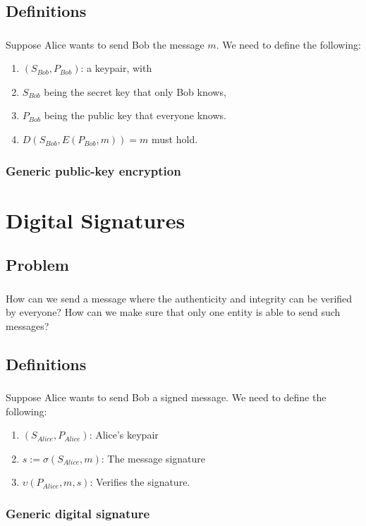 \documentclass{beamer}
\begin{document}
    \subsection{Definitions}
      \begin{frame}
        \frametitle{\insertsubsection}
        Suppose Alice wants to send Bob the message $m$. We need to define
        the following:
        \begin{enumerate}
          \item $(S_{Bob}, P_{Bob})$: a keypair, with
          \item $S_{Bob}$ being the secret key that only Bob knows,
          \item $P_{Bob}$ being the public key that everyone knows.
          \item $D(S_{Bob}, E(P_{Bob}, m)) = m$ must hold.
        \end{enumerate}
      \end{frame}
      \begin{frame}
        \frametitle{Generic public-key encryption}
        \begin{center}
          
        \end{center}
      \end{frame}
  \section{Digital Signatures}
    \subsection{Problem}
      \begin{frame}
        \frametitle{\insertsubsection}
        How can we send a message where the authenticity and integrity can be
        verified by everyone? How can we make sure that only one entity is able to
        send such messages?
      \end{frame}
    \subsection{Definitions}
      \begin{frame}
        \frametitle{\insertsubsection}
        Suppose Alice wants to send Bob a signed message. We need to define the
        following:
        \begin{enumerate}
          \item $(S_{Alice}, P_{Alice})$: Alice's keypair
          \item $s:=\sigma(S_{Alice}, m)$: The message signature
          \item $\upsilon(P_{Alice}, m, s)$: Verifies the signature.
        \end{enumerate}
      \end{frame}
      \begin{frame}
        \frametitle{Generic digital signature}
        \begin{center}
          
        \end{center}
      \end{frame}
\end{document}
